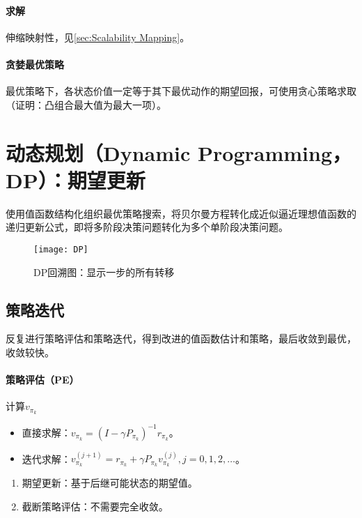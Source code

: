 \documentclass[
12pt, %
a4paper, 
oneside, %
headinclude,footinclude, %
]{scrartcl}
\begin{document}
\paragraph{求解}
伸缩映射性，见\ref{sec:Scalability Mapping}。\label{sec:Scalability Mapping back}
\paragraph{贪婪最优策略}
最优策略下，各状态价值一定等于其下最优动作的期望回报，可使用贪心策略求取（证明：凸组合最大值为最大一项）。
\section[动态规划]{动态规划（Dynamic Programming，DP）：期望更新}
\begin{minipage}{0.5\textwidth}
\hspace{2em}
使用值函数结构化组织最优策略搜索，将贝尔曼方程转化成近似逼近理想值函数的递归更新公式，即将多阶段决策问题转化为多个单阶段决策问题。
\end{minipage}
\hfill
\begin{minipage}{0.45\textwidth}
\begin{figure}[H]
\centering 
\texttt{[image: DP]} 
\caption[DP回溯图]{DP回溯图：显示一步的所有转移}
\end{figure}
\end{minipage}
\subsection[策略迭代]{策略迭代}
反复进行策略评估和策略迭代，得到改进的值函数估计和策略，最后收敛到最优，收敛较快。
\paragraph{策略评估（PE）}
计算$ v_{\pi_k} $
\begin{itemize}
\item 直接求解：$ v_{\pi_k} = (I - \gamma P_{\pi_k})^{-1} r_{\pi_k} $。
\item 迭代求解：$ v_{\pi_k}^{(j + 1)} = r_{\pi_k} + \gamma P_{\pi_k} v_{\pi_k}^{(j)}, j = 0, 1, 2, \dots $。
\end{itemize}
\begin{enumerate}
\item 期望更新：基于后继可能状态的期望值。
\item 截断策略评估：不需要完全收敛。
\end{enumerate}
\end{document}
